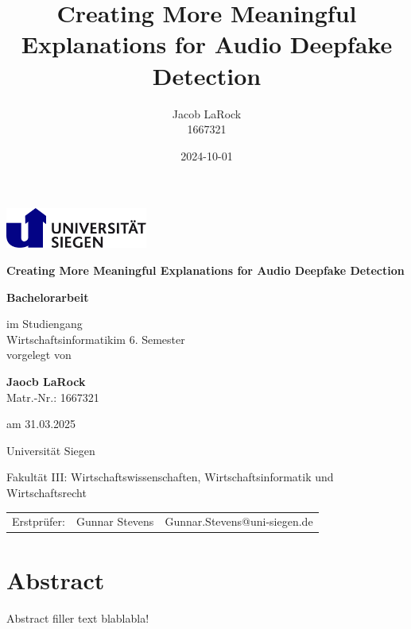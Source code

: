 \documentclass{article}
\title{Creating More Meaningful Explanations for Audio Deepfake Detection}
\date{2024-10-01}
\author{Jacob LaRock\\1667321}
\makeatletter
\def\Institute{Universität Siegen}
\def\KindOfWork{Bachelorarbeit}
\def\Studiengang{Wirtschaftsinformatik}
\def\Fakultaet{Fakultät III: Wirtschaftswissenschaften, Wirtschaftsinformatik und Wirtschaftsrecht}
\def\Title{Creating More Meaningful Explanations for Audio Deepfake Detection}
\def\Subtitle{}
\def\student{Jaocb LaRock}
\def\studentno{1667321}
\def\Date{31.03.2025}
\def\semester{6}
\def\erstpruefer{Gunnar Stevens}
\def\erstprueferMail{Gunnar.Stevens@uni-siegen.de}
\makeatother
\begin{document}
	\begin{titlepage}
        \begin{minipage}{0.9\linewidth}
			\centering
			\includegraphics [width=0.35\textwidth]{images/LogoSiegen}
        \end{minipage}

		\vspace{2cm}

		\centering

		{\Large\bfseries \Title\par}
		{\large\bfseries \Subtitle\par}
		\vspace{2cm}

		{\large \textbf{\KindOfWork}\par}

		\vspace{1.5cm}

		{\normalsize im Studiengang \\
			\Studiengang  im \semester. Semester \\
		}
		\vspace{0.5cm}
		{\normalsize vorgelegt von}
		\vspace{0.5cm}

		{\normalsize \textbf{\student} \\
			Matr.-Nr.: \studentno  \\}
		{am \normalsize \Date\par}

		\vspace{0.5cm}

		{\Institute} \par
		{\Fakultaet}\par

		\vspace{1cm}

    {\begin{table}[h]
			\centering
			\begin{tabular}{lll}
				{Erstprüfer:} & \erstpruefer & \erstprueferMail \\
			\end{tabular}
		\end{table}}     
		\vfill
	\end{titlepage}
    \newpage
    \section{Abstract}
    Abstract filler text blablabla!
\end{document}
